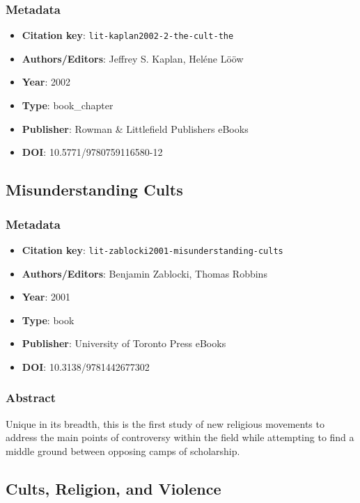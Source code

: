 \subsubsection*{Metadata}
\begin{itemize}
  \item \textbf{Citation key}: \texttt{lit-kaplan2002-2-the-cult-the}
  \item \textbf{Authors/Editors}: Jeffrey S. Kaplan, Heléne Lööw
  \item \textbf{Year}: 2002
  \item \textbf{Type}: book\_chapter
  \item \textbf{Publisher}: Rowman \& Littlefield Publishers eBooks
  \item \textbf{DOI}: 10.5771/9780759116580-12
\end{itemize}

\subsection{Misunderstanding Cults}\label{lit:lit-zablocki2001-misunderstanding-cults}
\subsubsection*{Metadata}
\begin{itemize}
  \item \textbf{Citation key}: \texttt{lit-zablocki2001-misunderstanding-cults}
  \item \textbf{Authors/Editors}: Benjamin Zablocki, Thomas Robbins
  \item \textbf{Year}: 2001
  \item \textbf{Type}: book
  \item \textbf{Publisher}: University of Toronto Press eBooks
  \item \textbf{DOI}: 10.3138/9781442677302
\end{itemize}
\subsubsection*{Abstract}
Unique in its breadth, this is the first study of new religious movements to address the main points of controversy within the field while attempting to find a middle ground between opposing camps of scholarship.

\subsection{Cults, Religion, and Violence}\label{lit:lit-bromley2002-cults-religion-and-violence}
